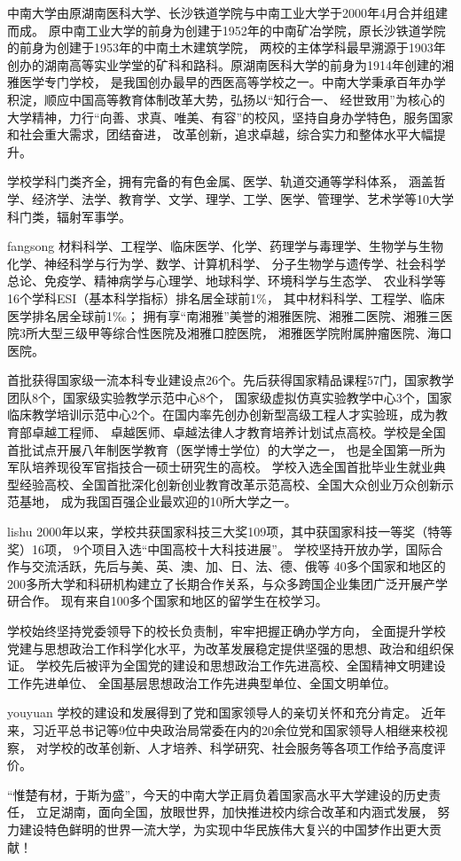 {\heiti 中南大学由原湖南医科大学、长沙铁道学院与中南工业大学于2000年4月合并组建而成。
原中南工业大学的前身为创建于1952年的中南矿冶学院，原长沙铁道学院的前身为创建于1953年的中南土木建筑学院，
两校的主体学科最早溯源于1903年创办的湖南高等实业学堂的矿科和路科。原湖南医科大学的前身为1914年创建的湘雅医学专门学校，
是我国创办最早的西医高等学校之一。中南大学秉承百年办学积淀，顺应中国高等教育体制改革大势，弘扬以“知行合一、
经世致用”为核心的大学精神，力行“向善、求真、唯美、有容”的校风，坚持自身办学特色，服务国家和社会重大需求，团结奋进，
改革创新，追求卓越，综合实力和整体水平大幅提升。
}

{\kaishu 学校学科门类齐全，拥有完备的有色金属、医学、轨道交通等学科体系，
涵盖哲学、经济学、法学、教育学、文学、理学、工学、医学、管理学、艺术学等10大学科门类，辐射军事学。
}

{\ifcsname fangsong\endcsname\fangsong\else[无 \cs{fangsong} 字体。]\fi
材料科学、工程学、临床医学、化学、药理学与毒理学、生物学与生物化学、神经科学与行为学、数学、计算机科学、
分子生物学与遗传学、社会科学总论、免疫学、精神病学与心理学、地球科学、环境科学与生态学、
农业科学等16个学科ESI（基本科学指标）排名居全球前1\%，
其中材料科学、工程学、临床医学排名居全球前1‰；
拥有享“南湘雅”美誉的湘雅医院、湘雅二医院、湘雅三医院3所大型三级甲等综合性医院及湘雅口腔医院，
湘雅医学院附属肿瘤医院、海口医院。

首批获得国家级一流本科专业建设点26个。先后获得国家精品课程57门，国家教学团队8个，国家级实验教学示范中心8个，
国家级虚拟仿真实验教学中心3个，国家临床教学培训示范中心2个。在国内率先创办创新型高级工程人才实验班，成为教育部卓越工程师、
卓越医师、卓越法律人才教育培养计划试点高校。学校是全国首批试点开展八年制医学教育（医学博士学位）的大学之一，
也是全国第一所为军队培养现役军官指技合一硕士研究生的高校。
学校入选全国首批毕业生就业典型经验高校、全国首批深化创新创业教育改革示范高校、全国大众创业万众创新示范基地，
成为我国百强企业最欢迎的10所大学之一。
}

{\ifcsname lishu\endcsname\lishu\else[无 \cs{lishu} 字体。]\fi
2000年以来，学校共获国家科技三大奖109项，其中获国家科技一等奖（特等奖）16项，
9个项目入选“中国高校十大科技进展”。
学校坚持开放办学，国际合作与交流活跃，先后与美、英、澳、加、日、法、德、俄等
40多个国家和地区的200多所大学和科研机构建立了长期合作关系，与众多跨国企业集团广泛开展产学研合作。
现有来自100多个国家和地区的留学生在校学习。

学校始终坚持党委领导下的校长负责制，牢牢把握正确办学方向，
全面提升学校党建与思想政治工作科学化水平，为改革发展稳定提供坚强的思想、政治和组织保证。
学校先后被评为全国党的建设和思想政治工作先进高校、全国精神文明建设工作先进单位、
全国基层思想政治工作先进典型单位、全国文明单位。
}

{\ifcsname youyuan\endcsname\youyuan\else[无 \cs{youyuan} 字体。]\fi
学校的建设和发展得到了党和国家领导人的亲切关怀和充分肯定。
近年来，习近平总书记等9位中央政治局常委在内的20余位党和国家领导人相继来校视察，
对学校的改革创新、人才培养、科学研究、社会服务等各项工作给予高度评价。

“惟楚有材，于斯为盛”，今天的中南大学正肩负着国家高水平大学建设的历史责任，
立足湖南，面向全国，放眼世界，加快推进校内综合改革和内涵式发展，
努力建设特色鲜明的世界一流大学，为实现中华民族伟大复兴的中国梦作出更大贡献！}
